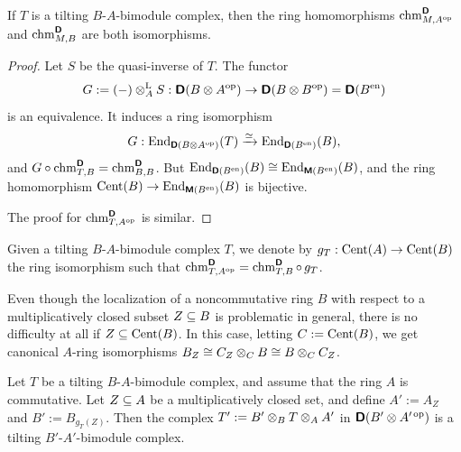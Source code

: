 \begin{lem} \label{lem:3580}
If $T$ is a tilting $B$-$A$-bimodule complex, then the ring homomorphisms 
$\operatorname{chm}^{\boldsymbol{\mathsf{D}}}_{M, A^{\mathrm{op}}}$ and 
$\operatorname{chm}^{\boldsymbol{\mathsf{D}}}_{M, B}$ are both isomorphisms. 
\end{lem}

\begin{proof}
Let $S$ be the quasi-inverse of $T$. The functor 
\[ G := (-) \otimes^{\mathrm{L}}_{A} S : \boldsymbol{\mathsf{D}}(B \otimes A^{\mathrm{op}}) \to 
\boldsymbol{\mathsf{D}}(B \otimes B^{\mathrm{op}}) = \boldsymbol{\mathsf{D}}(B^{\mathrm{en}}) \]
is an equivalence. It induces a ring isomorphism
\[ G : \operatorname{End}_{\boldsymbol{\mathsf{D}}(B \otimes A^{\mathrm{op}})}(T) \xrightarrow{\simeq} 
\operatorname{End}_{\boldsymbol{\mathsf{D}}(B^{\mathrm{en}})}(B) , \]
and 
$G \circ \operatorname{chm}^{\boldsymbol{\mathsf{D}}}_{T, B} = \operatorname{chm}^{\boldsymbol{\mathsf{D}}}_{B, B}$.
But 
$\operatorname{End}_{\boldsymbol{\mathsf{D}}(B^{\mathrm{en}})}(B) \cong 
\operatorname{End}_{\boldsymbol{\mathsf{M}}(B^{\mathrm{en}})}(B)$,
and the ring homomorphism 
$\operatorname{Cent}(B) \to \operatorname{End}_{\boldsymbol{\mathsf{M}}(B^{\mathrm{en}})}(B)$
is bijective. 

The proof for $\operatorname{chm}^{\boldsymbol{\mathsf{D}}}_{T, A^{\mathrm{op}}}$ is similar.
\end{proof}

\begin{dfn} \label{dfn:5090}
Given a tilting $B$-$A$-bimodule complex $T$, we denote by 
$g_T : \operatorname{Cent}(A) \to \operatorname{Cent}(B)$
the ring isomorphism such that 
$\operatorname{chm}^{\boldsymbol{\mathsf{D}}}_{T, A^{\mathrm{op}}}  = 
\operatorname{chm}^{\boldsymbol{\mathsf{D}}}_{T, B} \circ \, g_T$.
\end{dfn}

Even though the localization of a noncommutative ring $B$ with respect to a 
multiplicatively closed subset $Z \subseteq B$ is problematic in general, there is 
no difficulty at all if $Z \subseteq \operatorname{Cent}(B)$. In this case,
letting $C := \operatorname{Cent}(B)$, we get canonical $A$-ring isomorphisms
$B_{Z} \cong C_{Z} \otimes_C B \cong B \otimes_C C_Z$.

\begin{lem} \label{lem:3581}
Let $T$ be a tilting $B$-$A$-bimodule complex, and assume that the ring $A$ is 
commutative. Let $Z \subseteq A$ be a multiplicatively 
closed set, and define $A' := A_Z$ and $B' := B_{g_T(Z)}$. Then 
the complex 
$T' := B' \otimes_B T \otimes_A A'$ in 
$\boldsymbol{\mathsf{D}}(B' \otimes A'^{\, \mathrm{op}})$
is a tilting $B'$-$A'$-bimodule complex.
\end{lem}

